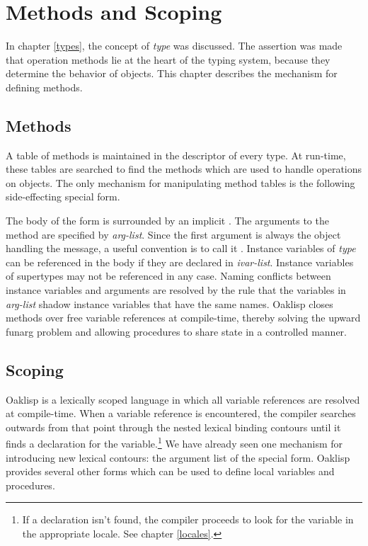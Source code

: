 \chapter{Methods and Scoping} \label{methods}

In chapter \ref{types}, the concept of {\it type} was discussed.
The assertion was made that operation methods lie at the heart of the
typing system, because they determine the behavior of objects.  This
chapter describes the mechanism for defining methods.

\section{Methods}

A table of methods is maintained in the descriptor of every type. At
run-time, these tables are searched to find the methods which are used
to handle operations on objects. The only mechanism for manipulating
method tables is the following side-effecting special form.


The body of the form is surrounded by an implicit .  The
arguments to the method are specified by \emph{arg-list}.  Since the
first argument is always the object handling the message, a useful
convention is to call it .  Instance variables of \emph{type}
can be referenced in the body if they are declared in \emph{ivar-list}.
Instance variables of supertypes may not be referenced in any case.
Naming conflicts between instance variables and arguments are resolved
by the rule that the variables in \emph{arg-list} shadow instance
variables that have the same names.  Oaklisp closes methods over free
variable references at compile-time, thereby solving the upward funarg
problem and allowing procedures to share state in a controlled manner.


\section{Scoping}

Oaklisp is a lexically scoped language in which all variable
references are resolved at compile-time.  When a variable reference is
encountered, the compiler searches outwards from that point through
the nested lexical binding contours until it finds a declaration for
the variable.\footnote{If a declaration isn't found, the compiler
proceeds to look for the variable in the appropriate locale. See
chapter \ref{locales}.} We have already seen one mechanism for
introducing new lexical contours: the argument list of the
 special form.  Oaklisp provides several other forms
which can be used to define local variables and procedures.


